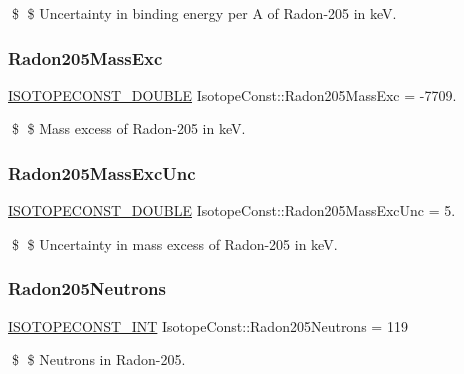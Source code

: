 \$ \$ Uncertainty in binding energy per A of Radon-\/205 in keV. \mbox{\label{group___isotope_const-_radon-_rn205_ga1ff7a187ede77ea3c4f9d3d4a994487f}} 
\subsubsection{\texorpdfstring{Radon205\+Mass\+Exc}{Radon205MassExc}}
{\footnotesize\ttfamily \mbox{\hyperlink{group___isotope_const-_macros_ga8f45a7272ce02c0b4c65c44636ed719a}{I\+S\+O\+T\+O\+P\+E\+C\+O\+N\+S\+T\+\_\+\+D\+O\+U\+B\+LE}} Isotope\+Const\+::\+Radon205\+Mass\+Exc = -\/7709.}

\$ \$ Mass excess of Radon-\/205 in keV. \mbox{\label{group___isotope_const-_radon-_rn205_ga05fb06fcb9f31a5b612fb806871acbff}} 
\subsubsection{\texorpdfstring{Radon205\+Mass\+Exc\+Unc}{Radon205MassExcUnc}}
{\footnotesize\ttfamily \mbox{\hyperlink{group___isotope_const-_macros_ga8f45a7272ce02c0b4c65c44636ed719a}{I\+S\+O\+T\+O\+P\+E\+C\+O\+N\+S\+T\+\_\+\+D\+O\+U\+B\+LE}} Isotope\+Const\+::\+Radon205\+Mass\+Exc\+Unc = 5.}

\$ \$ Uncertainty in mass excess of Radon-\/205 in keV. \mbox{\label{group___isotope_const-_radon-_rn205_ga4e5659abc2ab9280d19051e8fffcdf98}} 
\subsubsection{\texorpdfstring{Radon205\+Neutrons}{Radon205Neutrons}}
{\footnotesize\ttfamily \mbox{\hyperlink{group___isotope_const-_macros_ga5f18360b3e99483a35c32d789e62621c}{I\+S\+O\+T\+O\+P\+E\+C\+O\+N\+S\+T\+\_\+\+I\+NT}} Isotope\+Const\+::\+Radon205\+Neutrons = 119}

\$ \$ Neutrons in Radon-\/205. \mbox{\label{group___isotope_const-_radon-_rn205_gac79a8c3fd8f7d9f11c702bc7c6ad89b7}} 
